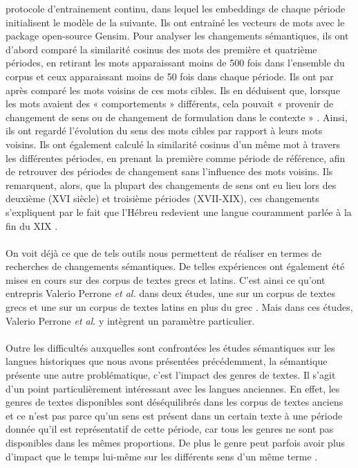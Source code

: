\documentclass{article}
\begin{document}
protocole d’entrainement continu, dans lequel les embeddings de chaque période initialisent le modèle de la suivante. Ils ont entrainé les vecteurs de mots avec le package open-source Gensim. Pour analyser les changements sémantiques, ils ont d’abord comparé la similarité cosinus des mots des première et quatrième périodes, en retirant les mots apparaissant moins de 500 fois dans l’ensemble du corpus et ceux apparaissant moins de 50 fois dans chaque période. Ils ont par après comparé les mots voisins de ces mots cibles. Ils en déduisent que, lorsque les mots avaient des « comportements » différents, cela pouvait « provenir de changement de sens ou de changement de formulation dans le contexte » \cite{liebeskind2020deep}. Ainsi, ils ont regardé l’évolution du sens des mots cibles par rapport à leurs mots voisins. Ils ont également calculé la similarité cosinus d’un même mot à travers les différentes périodes, en prenant la première comme période de référence, afin de retrouver des périodes de changement sans l’influence des mots voisins. Ils remarquent, alors, que la plupart des changements de sens ont eu lieu lors des deuxième (XVI siècle) et troisième périodes (XVII-XIX), ces changements s’expliquent par le fait que l’Hébreu redevient une langue couramment parlée à la fin du XIX \cite{liebeskind2020deep}. 
\paragraph{}
On voit déjà ce que de tels outils nous permettent de réaliser en termes de recherches de changements sémantiques. De telles expériences ont également été mises en cours sur des corpus de textes grecs et latins. C’est ainsi ce qu’ont entrepris Valerio Perrone \textit{et al.} dans deux études, une sur un corpus de textes grecs \cite{perrone2019gasc} et une sur un corpus de textes latins en plus du grec \cite{perrone2021lexical}. Mais dans ces études, Valerio Perrone \textit{et al}. y intègrent un paramètre particulier. 
\paragraph{}
Outre les difficultés auxquelles sont confrontées les études sémantiques sur les langues historiques que nous avons présentées précédemment, la sémantique présente une autre problématique, c’est l’impact des genres de textes. Il s’agit d’un point particulièrement intéressant avec les langues anciennes. En effet, les genres de textes disponibles sont déséquilibrés dans les corpus de textes anciens \cite{perrone2019gasc} et ce n’est pas parce qu’un sens est présent dans un certain texte à une période donnée qu’il est représentatif de cette période, car tous les genres ne sont pas disponibles dans les mêmes proportions. De plus le genre peut parfois avoir plus d’impact que le temps lui-même sur les différents sens d’un même terme \cite{perrone2019gasc}. 
\end{document}
